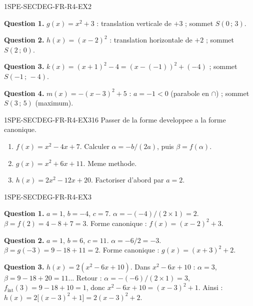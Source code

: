 \begin{corrige}{1SPE-SECDEG-FR-R4-EX2}


\textbf{Question 1.} $g(x) = x^2 + 3$ : translation verticale de $+3$ ; sommet $S(0\,;\,3)$.

\textbf{Question 2.} $h(x) = (x-2)^2$ : translation horizontale de $+2$ ; sommet $S(2\,;\,0)$.

\textbf{Question 3.} $k(x) = (x+1)^2 - 4 = (x-(-1))^2 + (-4)$ ; sommet $S(-1\,;\,-4)$.

\textbf{Question 4.} $m(x) = -(x-3)^2 + 5$ : $a = -1 < 0$ (parabole en $\cap$) ; sommet $S(3\,;\,5)$ (maximum).

\end{corrige}


\begin{exercice}{1SPE-SECDEG-FR-R4-EX3}{1}{6}
Passer de la forme developpee a la forme canonique.
\begin{enumerate}
  \item $f(x) = x^2 - 4x + 7$. Calculer $\alpha = -b/(2a)$, puis $\beta = f(\alpha)$.
  \item $g(x) = x^2 + 6x + 11$. Meme methode.
  \item $h(x) = 2x^2 - 12x + 20$. Factoriser d'abord par $a = 2$.
\end{enumerate}
\end{exercice}


\begin{corrige}{1SPE-SECDEG-FR-R4-EX3}

\textbf{Question 1.} $a = 1$, $b = -4$, $c = 7$.
$\alpha = -(-4)/(2 \times 1) = 2$.
$\beta = f(2) = 4 - 8 + 7 = 3$.
Forme canonique : $f(x) = (x-2)^2 + 3$.

\textbf{Question 2.} $a = 1$, $b = 6$, $c = 11$.
$\alpha = -6/2 = -3$.
$\beta = g(-3) = 9 - 18 + 11 = 2$.
Forme canonique : $g(x) = (x+3)^2 + 2$.


\textbf{Question 3.} $h(x) = 2(x^2 - 6x + 10)$.
Dans $x^2 - 6x + 10$ : $\alpha = 3$, $\beta = 9 - 18 + 20 = 11$... Retour : $\alpha = -(-6)/(2 \times 1) = 3$, $f_{\text{int}}(3) = 9 - 18 + 10 = 1$, donc $x^2 - 6x + 10 = (x-3)^2 + 1$.
Ainsi : $h(x) = 2\bigl[(x-3)^2 + 1\bigr] = 2(x-3)^2 + 2$.

\end{corrige}

